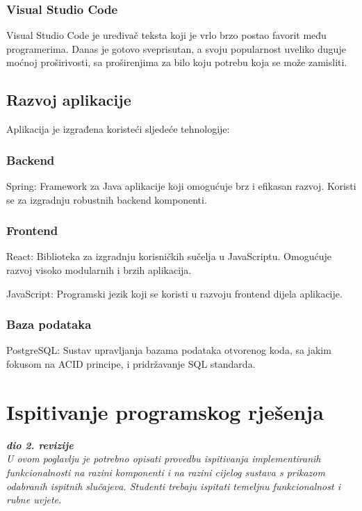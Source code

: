 \subsubsection{Visual Studio Code}
Visual Studio Code je uređivač teksta koji je vrlo brzo postao favorit među
programerima. Danas je gotovo sveprisutan, a svoju popularnost uveliko
duguje moćnoj proširivosti, sa proširenjima za bilo koju potrebu koja se
može zamisliti.

\subsection{Razvoj aplikacije}

Aplikacija je izgrađena koristeći sljedeće tehnologije:

\subsubsection{Backend}

Spring: Framework za Java aplikacije koji omogućuje brz i efikasan razvoj. 
Koristi se za izgradnju robustnih backend komponenti.

\subsubsection{Frontend}

React: Biblioteka za izgradnju korisničkih sučelja u JavaScriptu. Omogućuje 
razvoj visoko modularnih i brzih aplikacija.

JavaScript: Programski jezik koji se koristi u razvoju frontend dijela 
aplikacije.

\subsubsection{Baza podataka}

PostgreSQL: Sustav upravljanja bazama podataka otvorenog koda, sa jakim 
fokusom na ACID principe, i pridržavanje SQL standarda.
			
			
			\eject 
		
	
		\section{Ispitivanje programskog rješenja}
			
			\textbf{\textit{dio 2. revizije}}\\
			
			 \textit{U ovom poglavlju je potrebno opisati provedbu ispitivanja implementiranih funkcionalnosti na razini komponenti i na razini cijelog sustava s prikazom odabranih ispitnih slučajeva. Studenti trebaju ispitati temeljnu funkcionalnost i rubne uvjete.}
	
